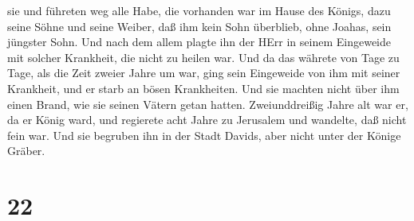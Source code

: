 sie und führeten weg alle Habe, die vorhanden war im Hause des Königs,
dazu seine Söhne und seine Weiber, daß ihm kein Sohn überblieb, ohne
Joahas, sein jüngster Sohn.  Und nach dem allem plagte ihn
der HErr in seinem Eingeweide mit solcher Krankheit, die nicht zu heilen
war.  Und da das währete von Tage zu Tage, als die Zeit
zweier Jahre um war, ging sein Eingeweide von ihm mit seiner Krankheit,
und er starb an bösen Krankheiten. Und sie machten nicht über ihm einen
Brand, wie sie seinen Vätern getan hatten.  Zweiunddreißig
Jahre alt war er, da er König ward, und regierete acht Jahre zu
Jerusalem und wandelte, daß nicht fein war. Und sie begruben ihn in der
Stadt Davids, aber nicht unter der Könige Gräber.

\hypertarget{section-21}{%
\section{22}\label{section-21}}

